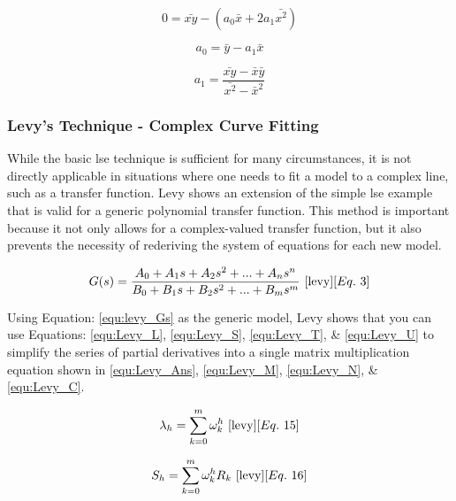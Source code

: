 \begin{equation}
    \label{equ:LSE_solb}
    0 = \bar{xy} - (a_0 \bar{x} + 2a_1 \bar{x^2})
\end{equation}

\begin{equation}
    \label{equ:LSE_solc}
    a_0 = \bar{y} - a_1 \bar{x}
\end{equation}

\begin{equation}
    \label{equ:LSE_sold}
    a_1 = \frac{\bar{xy} - \bar{x}\bar{y}}{\bar{x^2} - \bar{x}^2}
\end{equation}

\subsubsection{Levy's Technique - Complex Curve Fitting}
While the basic \gls{lse} technique is sufficient for many circumstances, it is not directly applicable in situations where one needs to fit a model to a complex line, such as a transfer function. Levy \cite{levy} shows an extension of the simple \gls{lse} example that is valid for a generic polynomial transfer function. This method is important because it not only allows for a complex-valued transfer function, but it also prevents the necessity of rederiving the system of equations for each new model. 

\begin{equation}
    \label{equ:levy_Gs}
    G(s) = \frac{A_0 + A_1 s + A_2 s^2 + ... + A_n s^n}{B_0 + B_1 s + B_2 s^2 + ... + B_m s^m}
    ~\cite{levy}[Eq.~3]
\end{equation}

Using Equation: \eqref{equ:levy_Gs} as the generic model, Levy shows that you can use Equations: \eqref{equ:Levy_L}, \eqref{equ:Levy_S}, \eqref{equ:Levy_T}, \& \eqref{equ:Levy_U} to simplify the series of partial derivatives into a single matrix multiplication equation shown in \eqref{equ:Levy_Ans}, \eqref{equ:Levy_M}, \eqref{equ:Levy_N}, \& \eqref{equ:Levy_C}.

\begin{equation}
    \label{equ:Levy_L}
    \lambda _h = \sum_{k=0}^{m} \omega _k ^h
    ~\cite{levy}[Eq.~15]
\end{equation}

\begin{equation}
    \label{equ:Levy_S}
    S_h = \sum_{k=0}^{m} \omega _k ^h R_k
    ~\cite{levy}[Eq.~16]
\end{equation}

